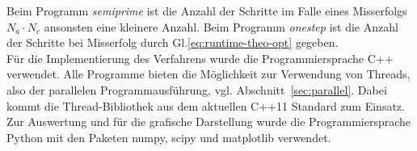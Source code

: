 Beim Programm \textit{semiprime} ist die Anzahl der Schritte im Falle eines Misserfolgs $N_a\cdot N_c$ ansonsten eine kleinere Anzahl. Beim Programm \textit{onestep} ist die Anzahl der Schritte bei Misserfolg durch Gl.\eqref{eq:runtime-theo-opt} gegeben.\\
Für die Implementierung des Verfahrens wurde die Programmiersprache C++ verwendet. Alle Programme bieten die Möglichkeit zur Verwendung von Threads, also der parallelen Programmausführung, vgl. Abschnitt~\ref{sec:parallel}. Dabei kommt die Thread-Bibliothek aus dem aktuellen C++11 Standard zum Einsatz. \\
Zur Auswertung und für die grafische Darstellung wurde die Programmiersprache Python mit den Paketen numpy, scipy und matplotlib verwendet. \\ 

